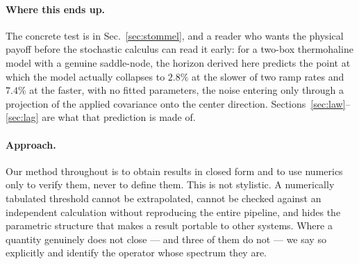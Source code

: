 \documentclass[%
 twocolumn,
 superscriptaddress,
 amsmath,amssymb,
 aps,
 pre,
 floatfix,
]{revtex4-2}
\begin{document}
\paragraph{Where this ends up.}
The concrete test is in Sec.~\ref{sec:stommel}, and a reader who wants the physical payoff before the stochastic calculus can read it early: for a two-box thermohaline model with a genuine saddle-node, the horizon derived here predicts the point at which the model actually collapses to $2.8\%$ at the slower of two ramp rates and $7.4\%$ at the faster, with no fitted parameters, the noise entering only through a projection of the applied covariance onto the center direction.  Sections~\ref{sec:law}--\ref{sec:lag} are what that prediction is made of.

\paragraph{Approach.}
Our method throughout is to obtain results in closed form and to use numerics only to verify them, never to define them.  This is not stylistic.  A numerically tabulated threshold cannot be extrapolated, cannot be checked against an independent calculation without reproducing the entire pipeline, and hides the parametric structure that makes a result portable to other systems.  Where a quantity genuinely does not close --- and three of them do not --- we say so explicitly and identify the operator whose spectrum they are.
\end{document}
